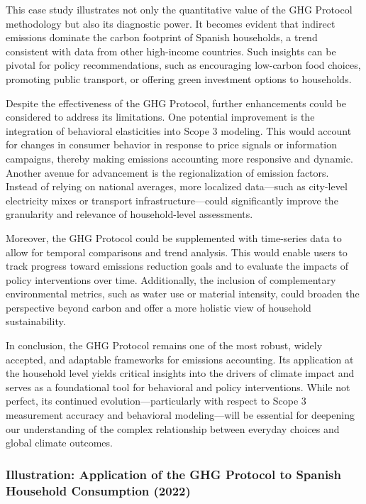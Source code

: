 \documentclass[12pt,a4paper]{article}
\begin{document}
This case study illustrates not only the quantitative value of the GHG Protocol methodology but also its diagnostic power. It becomes evident that indirect emissions dominate the carbon footprint of Spanish households, a trend consistent with data from other high-income countries. Such insights can be pivotal for policy recommendations, such as encouraging low-carbon food choices, promoting public transport, or offering green investment options to households.

Despite the effectiveness of the GHG Protocol, further enhancements could be considered to address its limitations. One potential improvement is the integration of behavioral elasticities into Scope 3 modeling. This would account for changes in consumer behavior in response to price signals or information campaigns, thereby making emissions accounting more responsive and dynamic. Another avenue for advancement is the regionalization of emission factors. Instead of relying on national averages, more localized data—such as city-level electricity mixes or transport infrastructure—could significantly improve the granularity and relevance of household-level assessments.

Moreover, the GHG Protocol could be supplemented with time-series data to allow for temporal comparisons and trend analysis. This would enable users to track progress toward emissions reduction goals and to evaluate the impacts of policy interventions over time. Additionally, the inclusion of complementary environmental metrics, such as water use or material intensity, could broaden the perspective beyond carbon and offer a more holistic view of household sustainability.

In conclusion, the GHG Protocol remains one of the most robust, widely accepted, and adaptable frameworks for emissions accounting. Its application at the household level yields critical insights into the drivers of climate impact and serves as a foundational tool for behavioral and policy interventions. While not perfect, its continued evolution—particularly with respect to Scope 3 measurement accuracy and behavioral modeling—will be essential for deepening our understanding of the complex relationship between everyday choices and global climate outcomes.

\subsubsection*{Illustration: Application of the GHG Protocol to Spanish Household Consumption (2022)}
\end{document}
